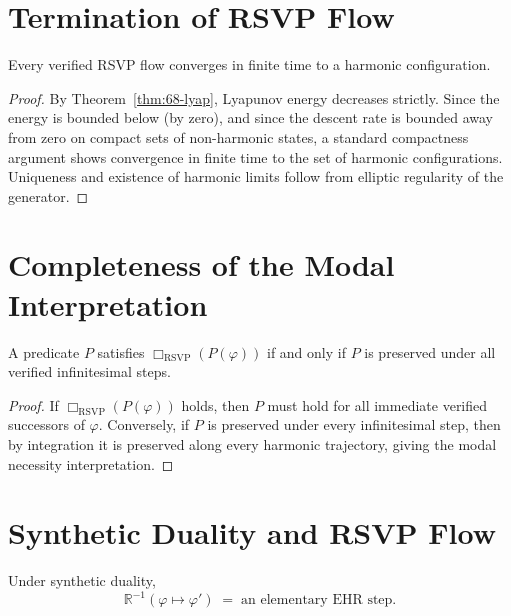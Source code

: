 \section{Termination of RSVP Flow}

\begin{theorem}[Termination]
\label{thm:68-term}
Every verified RSVP flow converges in finite time to a harmonic configuration.
\end{theorem}

\begin{proof}
By Theorem~\ref{thm:68-lyap}, Lyapunov energy decreases strictly.
Since the energy is bounded below (by zero), and since the descent rate is 
bounded away from zero on compact sets of non-harmonic states, a standard 
compactness argument shows convergence in finite time to the set of harmonic 
configurations.  
Uniqueness and existence of harmonic limits follow from elliptic regularity of 
the generator.
\end{proof}

\section{Completeness of the Modal Interpretation}

\begin{theorem}
\label{thm:68-comp}
A predicate $P$ satisfies $\Box_{\mathrm{RSVP}}(P(\varphi))$ if and only if 
$P$ is preserved under all verified infinitesimal steps.
\end{theorem}

\begin{proof}
If $\Box_{\mathrm{RSVP}}(P(\varphi))$ holds, then $P$ must hold for all 
immediate verified successors of $\varphi$.  
Conversely, if $P$ is preserved under every infinitesimal step, then by 
integration it is preserved along every harmonic trajectory, giving the 
modal necessity interpretation.
\end{proof}

\section{Synthetic Duality and RSVP Flow}

\begin{theorem}
\label{thm:68-dual}
Under synthetic duality,
\[
\mathbb{R}^{-1}(\varphi \mapsto \varphi') 
\;=\; 
\text{an elementary EHR step}.
\]
\end{theorem}

